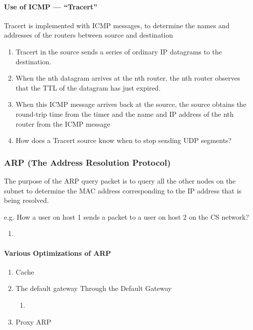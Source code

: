 \paragraph{Use of ICMP --- ``Tracert''}Tracert is implemented with ICMP messages,  to determine
the names and addresses of the routers between source and
destination
\begin{enumerate}\small %
    \item Tracert in the source sends a series of ordinary IP datagrams to
    the destination.
    \item When the nth datagram arrives at the nth router, the nth router
    observes that the TTL of the datagram has just expired.
    \item When this ICMP message arrives back at the source, the source
    obtains the round-trip time from the timer and the name and IP
    address of the nth router from the ICMP message
    \item How does a Tracert source know when to stop sending UDP segments?
\end{enumerate}

\subsubsection{ARP (The Address Resolution Protocol)}
The purpose of the ARP query packet is to query all the other
nodes on the subnet to determine the MAC address corresponding
to the IP address that is being resolved. 

e.g. How a user on host 1 sends a packet to a user on host 2 on
the CS network? %
\begin{enumerate}
    \item 
\end{enumerate}

\paragraph{Various Optimizations of ARP}\quad %
\begin{enumerate}
    \item Cache
    \item The default gateway
    \subitem Through the Default Gateway
    \begin{enumerate}
        \item 
    \end{enumerate}
    \item Proxy ARP
\end{enumerate}

